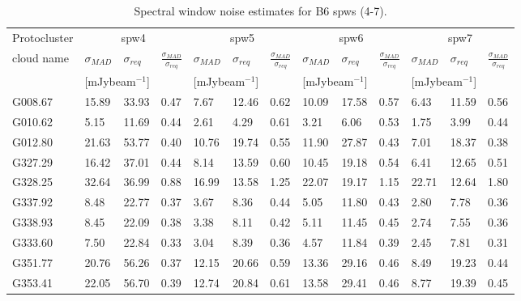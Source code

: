 \begin{table}[htbp!]
\ContinuedFloat
\centering
\caption{Spectral window noise estimates for B6 spws (4-7).}
\begin{tabular}{@{\extracolsep{4pt}}lllllllllllll@{}}

\hline \noalign {\smallskip}
Protocluster  & \multicolumn{3}{c}{spw4}  & \multicolumn{3}{c}{spw5}  & \multicolumn{3}{c}{spw6}
    & \multicolumn{3}{c}{spw7}  \\ %
\cline{2-4}\cline{5-7}\cline{8-10}\cline{11-13}
cloud name\tnote{1}  & $\sigma_{MAD}$ & $\sigma_{req}$ & $\frac{\sigma_{MAD}}{\sigma_{req}}$  & $\sigma_{MAD}$ & $\sigma_{req}$ & $\frac{\sigma_{MAD}}{\sigma_{req}}$  & $\sigma_{MAD}$ & $\sigma_{req}$ & $\frac{\sigma_{MAD}}{\sigma_{req}}$  & $\sigma_{MAD}$ & $\sigma_{req}$ & $\frac{\sigma_{MAD}}{\sigma_{req}}$\\
& \multicolumn{2}{c}{[mJybeam$^{-1}$]}& & \multicolumn{2}{c}{[mJybeam$^{-1}$]}& &  \multicolumn{2}{c}{[mJybeam$^{-1}$]}& & \multicolumn{2}{c}{[mJybeam$^{-1}$]}\\
\hline \noalign {\smallskip}
G008.67  &  15.89 & 33.93 & 0.47 & 7.67 & 12.46 & 0.62 & 10.09 & 17.58 & 0.57 & 6.43 & 11.59 & 0.56 \\
G010.62  &  5.15 & 11.69 & 0.44 & 2.61 & 4.29 & 0.61 & 3.21 & 6.06 & 0.53 & 1.75 & 3.99 & 0.44 \\
G012.80  &  21.63 & 53.77 & 0.40 & 10.76 & 19.74 & 0.55 & 11.90 & 27.87 & 0.43 & 7.01 & 18.37 & 0.38 \\
G327.29  &  16.42 & 37.01 & 0.44 & 8.14 & 13.59 & 0.60 & 10.45 & 19.18 & 0.54 & 6.41 & 12.65 & 0.51 \\
G328.25  &  32.64 & 36.99 & 0.88 & 16.99 & 13.58 & 1.25 & 22.07 & 19.17 & 1.15 & 22.71 & 12.64 & 1.80 \\
G337.92  &  8.48 & 22.77 & 0.37 & 3.67 & 8.36 & 0.44 & 5.05 & 11.80 & 0.43 & 2.80 & 7.78 & 0.36 \\
G338.93  &  8.45 & 22.09 & 0.38 & 3.38 & 8.11 & 0.42 & 5.11 & 11.45 & 0.45 & 2.74 & 7.55 & 0.36 \\
G333.60  &  7.50 & 22.84 & 0.33 & 3.04 & 8.39 & 0.36 & 4.57 & 11.84 & 0.39 & 2.45 & 7.81 & 0.31 \\
G351.77  &  20.76 & 56.26 & 0.37 & 12.15 & 20.66 & 0.59 & 13.36 & 29.16 & 0.46 & 8.49 & 19.23 & 0.44 \\
G353.41  &  22.05 & 56.70 & 0.39 & 12.74 & 20.84 & 0.61 & 13.58 & 29.41 & 0.46 & 8.77 & 19.39 & 0.45 \\

\end{tabular}
\end{table}
